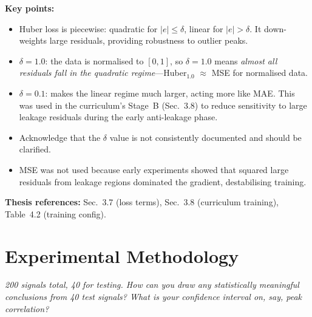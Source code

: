 \documentclass[11pt, letterpaper]{article}
\newcounter{qcounter}
\newcommand{\question}[1]{%
  \stepcounter{qcounter}%
  \begin{questionbox}[Q\theqcounter]%
    \itshape #1%
  \end{questionbox}%
}
\begin{document}
\begin{answerbox}
\textbf{Key points:}
\begin{itemize}[nosep]
  \item Huber loss is piecewise: quadratic for $|e| \le \delta$,
        linear for $|e| > \delta$.  It down-weights large residuals,
        providing robustness to outlier peaks.
  \item $\delta{=}1.0$: the data is normalised to $[0, 1]$, so
        $\delta{=}1.0$ means \emph{almost all residuals fall in the
        quadratic regime}---Huber$_{1.0}$ $\approx$ MSE for
        normalised data.
  \item $\delta{=}0.1$: makes the linear regime much larger, acting
        more like MAE.  This was used in the curriculum's Stage~B
        (Sec.~3.8) to reduce sensitivity to large leakage residuals
        during the early anti-leakage phase.
  \item Acknowledge that the $\delta$ value is not consistently
        documented and should be clarified.
  \item MSE was not used because early experiments showed that
        squared large residuals from leakage regions dominated the
        gradient, destabilising training.
\end{itemize}
\textbf{Thesis references:} Sec.~3.7 (loss terms), Sec.~3.8 (curriculum training), Table~4.2 (training config).
\end{answerbox}


\section{Experimental Methodology}

\question{200 signals total, 40 for testing.  How can you draw
\emph{any} statistically meaningful conclusions from 40 test
signals?  What is your confidence interval on, say, peak
correlation?}
\end{document}
